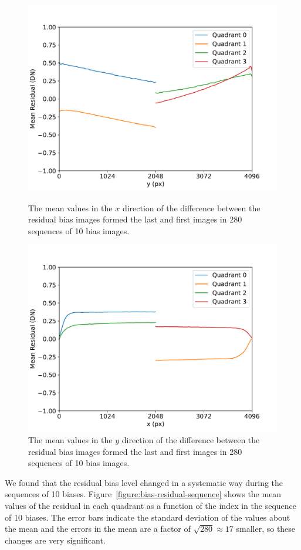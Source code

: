 \documentclass{article}
\begin{document}
\begin{figure}[pb]
\begin{center}
\includegraphics[width=0.7\columnwidth]{figures/bias-diff-y.pdf}
\medskip
\caption{The mean values in the $x$ direction of the difference between the residual bias images formed the last and first images in 280 sequences of 10 bias images.}
\label{figure:bias-diff-y}
\end{center}
\begin{center}
\includegraphics[width=0.7\columnwidth]{figures/bias-diff-x.pdf}
\medskip
\caption{The mean values in the $y$ direction of the difference between the residual bias images formed the last and first images in 280 sequences of 10 bias images.}
\label{figure:bias-diff-x}
\end{center}
\end{figure}

We found that the residual bias level changed in a systematic way during the sequences of 10 biases. Figure~\ref{figure:bias-residual-sequence} shows the mean values of the residual in each quadrant as a function of the index in the sequence of 10 biases. The error bars indicate the standard deviation of the values about the mean and the errors in the mean are a factor of $\sqrt{280} \approx 17$ smaller, so these changes are very significant. 
\end{document}
